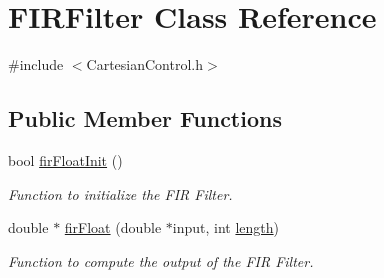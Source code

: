 \hypertarget{classFIRFilter}{}\section{F\+I\+R\+Filter Class Reference}
\label{classFIRFilter}


{\ttfamily \#include $<$Cartesian\+Control.\+h$>$}

\subsection*{Public Member Functions}
\begin{DoxyCompactItemize}
\item 
bool \hyperlink{classFIRFilter_a03b7ef73545b59416afe789235b4404a}{fir\+Float\+Init} ()
\begin{DoxyCompactList}\small\item\em Function to initialize the F\+IR Filter. \end{DoxyCompactList}\item 
double $\ast$ \hyperlink{classFIRFilter_aca52df7e1d89d1c324489daaff6fa526}{fir\+Float} (double $\ast$input, int \hyperlink{classFIRFilter_a4e697a78993656c942005939a3439b3f}{length})
\begin{DoxyCompactList}\small\item\em Function to compute the output of the F\+IR Filter. \end{DoxyCompactList}\end{DoxyCompactItemize}
